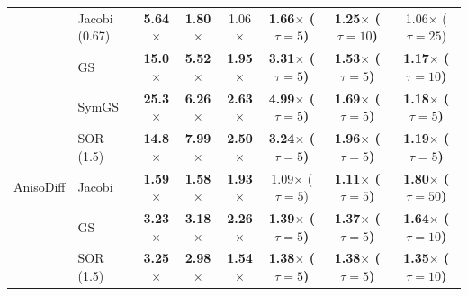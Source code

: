{\begin{tabular}{llcccccc}
 & Jacobi (0.67) & \textbf{5.64$\times$} & \textbf{1.80$\times$} & 1.06$\times$ & \textbf{1.66$\times$ ($\tau{=}5$)} & \textbf{1.25$\times$ ($\tau{=}10$)} & 1.06$\times$ ($\tau{=}25$) \\
 & GS & \textbf{15.0$\times$} & \textbf{5.52$\times$} & \textbf{1.95$\times$} & \textbf{3.31$\times$ ($\tau{=}5$)} & \textbf{1.53$\times$ ($\tau{=}5$)} & \textbf{1.17$\times$ ($\tau{=}10$)} \\
 & SymGS & \textbf{25.3$\times$} & \textbf{6.26$\times$} & \textbf{2.63$\times$} & \textbf{4.99$\times$ ($\tau{=}5$)} & \textbf{1.69$\times$ ($\tau{=}5$)} & \textbf{1.18$\times$ ($\tau{=}5$)} \\
 & SOR (1.5) & \textbf{14.8$\times$} & \textbf{7.99$\times$} & \textbf{2.50$\times$} & \textbf{3.24$\times$ ($\tau{=}5$)} & \textbf{1.96$\times$ ($\tau{=}5$)} & \textbf{1.19$\times$ ($\tau{=}5$)} \\
\midrule
AnisoDiff & Jacobi & \textbf{1.59$\times$} & \textbf{1.58$\times$} & \textbf{1.93$\times$} & 1.09$\times$ ($\tau{=}5$) & \textbf{1.11$\times$ ($\tau{=}5$)} & \textbf{1.80$\times$ ($\tau{=}50$)} \\
 & GS & \textbf{3.23$\times$} & \textbf{3.18$\times$} & \textbf{2.26$\times$} & \textbf{1.39$\times$ ($\tau{=}5$)} & \textbf{1.37$\times$ ($\tau{=}5$)} & \textbf{1.64$\times$ ($\tau{=}10$)} \\
 & SOR (1.5) & \textbf{3.25$\times$} & \textbf{2.98$\times$} & \textbf{1.54$\times$} & \textbf{1.38$\times$ ($\tau{=}5$)} & \textbf{1.38$\times$ ($\tau{=}5$)} & \textbf{1.35$\times$ ($\tau{=}10$)} \\
\bottomrule
\end{tabular}}
